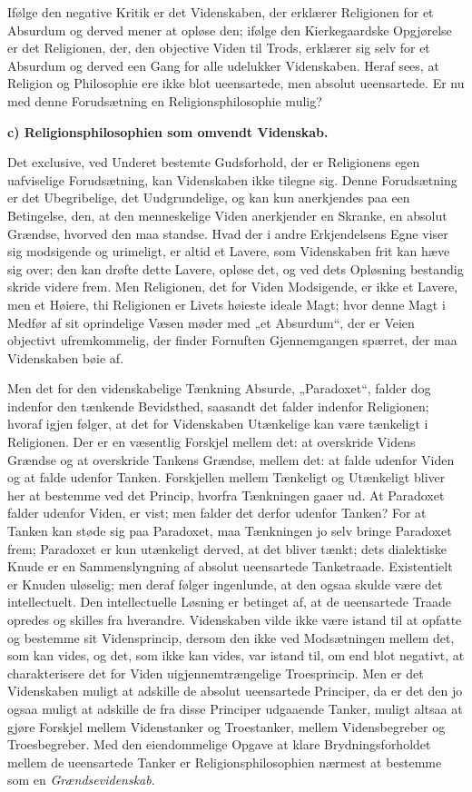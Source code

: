 \documentclass[12pt]{book}
\newcommand{\runhead}[1]{%
  \medskip\begin{center}{\bfseries #1}\end{center}\medskip}
\begin{document}
Ifølge den negative Kritik er det Videnskaben, der erklærer
Religionen for et Absurdum og derved mener at opløse den; ifølge den
Kierkegaardske Opgjørelse er det Religionen, der, den objective
Viden til Trods, erklærer sig selv for et Absurdum og derved een
Gang for alle udelukker Videnskaben. Heraf sees, at Religion og
Philosophie ere ikke blot ueensartede, men absolut ueensartede. Er
nu med denne Forudsætning en Religionsphilosophie mulig?

\runhead{c) Religionsphilosophien som omvendt Videnskab.}

Det exclusive, ved Underet bestemte Gudsforhold, der er Religionens
egen uafviselige Forudsætning, kan Videnskaben ikke tilegne sig.
Denne Forudsætning er
det Ubegribelige, det Uudgrundelige, og kan kun anerkjendes paa een
Betingelse, den, at den menneskelige Viden anerkjender en Skranke,
en absolut Grændse, hvorved den maa standse. Hvad der i andre
Erkjendelsens Egne viser sig modsigende og urimeligt, er altid et
Lavere, som Videnskaben frit kan hæve sig over; den kan drøfte dette
Lavere, opløse det, og ved dets Opløsning bestandig skride videre
frem. Men Religionen, det for Viden Modsigende, er ikke et Lavere,
men et Høiere, thi Religionen er Livets høieste ideale Magt; hvor
denne Magt i Medfør af sit oprindelige Væsen møder med „et
Absurdum“, der er Veien objectivt ufremkommelig, der finder
Fornuften Gjennemgangen spærret, der maa Videnskaben bøie af.

Men det for den videnskabelige Tænkning Absurde, „Paradoxet“, falder
dog indenfor den tænkende Bevidsthed, saasandt det falder indenfor
Religionen; hvoraf igjen følger, at det for Videnskaben Utænkelige
kan være tænkeligt i Religionen. Der er en væsentlig Forskjel mellem
det: at overskride Videns Grændse og at overskride Tankens Grændse,
mellem det: at falde udenfor Viden og at falde udenfor Tanken.
Forskjellen mellem Tænkeligt og Utænkeligt bliver her at bestemme
ved det Princip, hvorfra Tænkningen gaaer ud. At Paradoxet falder
udenfor Viden, er vist; men falder det derfor udenfor Tanken? For at
Tanken kan støde sig paa Paradoxet, maa Tænkningen jo selv bringe
Paradoxet frem; Paradoxet er kun utænkeligt derved, at det bliver
tænkt; dets dialektiske Knude er en Sammenslyngning af absolut
ueensartede Tanketraade. Existentielt er Knuden uløselig; men deraf
følger ingenlunde, at den ogsaa skulde være det intellectuelt. Den
intellectuelle Løsning er betinget af, at de ueensartede Traade
opredes og skilles fra hverandre. Videnskaben vilde ikke være istand
til at opfatte og bestemme sit Vidensprincip, dersom den ikke
ved Modsætningen mellem det, som kan vides, og det, som ikke kan
vides, var istand til, om end blot negativt, at charakterisere det
for Viden uigjennemtrængelige Troesprincip. Men er det Videnskaben
muligt at adskille de absolut ueensartede Principer, da er det den
jo ogsaa muligt at adskille de fra disse Principer udgaaende Tanker,
muligt altsaa at gjøre Forskjel mellem Videnstanker og Troestanker,
mellem Vidensbegreber og Troesbegreber. Med den eiendommelige Opgave
at klare Brydningsforholdet mellem de ueensartede Tanker er
Religionsphilosophien nærmest at bestemme som en
\emph{Grændsevidenskab}.
\end{document}
